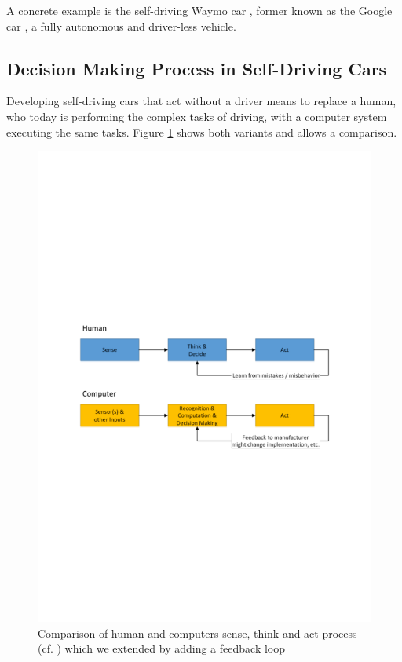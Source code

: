 A concrete example is the self-driving Waymo car \cite{Waymo2017}, former known as the Google car \cite{Google2016}, a fully autonomous and driver-less vehicle. 


\subsection{Decision Making Process in Self-Driving Cars}
\label{sec:SelfDrivingCarsBasics:DecisionMakingProcess}

Developing self-driving cars that act without a driver means to replace a human, who today is performing the complex tasks of driving, with a computer system executing the same tasks. Figure  \ref{fig:ComparisonHumanComputerProcess} shows both variants and allows a comparison. 

\begin{figure}
\centering
\includegraphics[width=1\linewidth]{Figures/comparisonHuman_Computers_Sense.pdf}
\caption{Comparison of human and computers sense, think and act process (cf. \cite{Ghisio2016}) which we extended by adding a feedback loop}
\label{fig:ComparisonHumanComputerProcess}
\end{figure}

